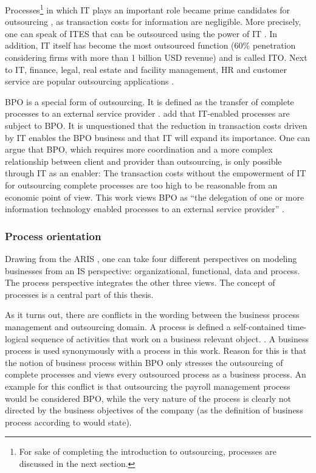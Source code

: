 		
		Processes\footnote{For sake of completing the introduction to outsourcing, processes are discussed in the next section. } in which IT plays an important role became prime candidates for outsourcing \citep[]{gross2006}, as transaction costs for information are negligible. More precisely, one can speak of \acrfull{ITES} that can be outsourced using the power of IT \citep[]{Ramachandran2004}. In addition, IT itself has become the most outsourced function (60\% penetration \citep{deloitte2014outsourcing} considering firms with more than 1 billion USD revenue) and is called \acrfull{ITO}. Next to IT, finance, legal, real estate and facility management, HR and customer service are popular outsourcing applications \citep{deloitte2014outsourcing}. 
		
		\acrshort{BPO} is a special form of outsourcing. It is defined as the transfer of complete processes to an external service provider \citep{wullenweber2008impact}. \cite{mani2010emp} add that IT-enabled processes are subject to BPO. It is unquestioned that the reduction in transaction costs driven by IT enables the BPO business and that IT will expand its importance. One can argue that BPO, which requires more coordination and a more complex relationship between client and provider than outsourcing, is only possible through IT as an enabler: The transaction costs without the empowerment of IT for outsourcing complete processes are too high to be reasonable from an economic point of view. This work views  BPO as \enquote{the delegation of one or more information technology enabled processes to an external service provider} \citep[]{mani2010emp}.
		
		\subsubsection{Process orientation}
		\label{processorientation}
	Drawing from the  \acrfull{ARIS} \citep{Scheer1997}, one can take four different perspectives on modeling businesses from an \acrshort{IS} perspective: organizational, functional, data and process. The process perspective integrates the other three views. The concept of processes is a central part of this thesis. 

	As it turns out, there are conflicts in the wording between the business process management and outsourcing domain. A process is defined a self-contained time-logical sequence of activities that work on a business relevant object. \citep[]{becker2012pm}.
	A business process is used synonymously with a process in this work. Reason for this is that the notion of business process within BPO only stresses the outsourcing of complete processes and views every outsourced process as a business process.  An example for this conflict is that outsourcing the payroll management process would be considered \acrshort{BPO}, while the very nature of the process is clearly not directed by the business objectives of the company (as the definition of business process according to \citep[]{becker2012pm} would state). 
	
